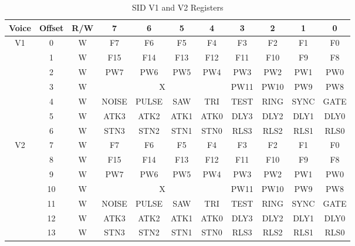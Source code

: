 \begin{table}[ht]
	\begin{center}
		\begin{tabular}{|c|c|c|c|c|c|c|c|c|c|c|} \hline
			Voice & Offset & R/W & 7 & 6 & 5 & 4 & 3 & 2 & 1 & 0 \\ \hline\hline
            \multirow{7}{*}{V1} & 0 & W & F7 & F6 & F5 & F4 & F3 & F2 & F1 & F0 \\ \cline{2-11}
            & 1 & W & F15 & F14 & F13 & F12 & F11 & F10 & F9 & F8 \\ \cline{2-11}
            & 2 & W & PW7 & PW6 & PW5 & PW4 & PW3 & PW2 & PW1 & PW0 \\ \cline{2-11}
            & 3 & W & \multicolumn{4}{|c|}{X} & PW11 & PW10 & PW9 & PW8 \\ \cline{2-11}
            & 4 & W & NOISE & PULSE & SAW & TRI & TEST & RING & SYNC & GATE \\ \cline{2-11}
            & 5 & W & ATK3 & ATK2 & ATK1 & ATK0 & DLY3 & DLY2 & DLY1 & DLY0 \\ \cline{2-11}
            & 6 & W & STN3 & STN2 & STN1 & STN0 & RLS3 & RLS2 & RLS1 & RLS0 \\ \hline\hline

            \multirow{7}{*}{V2} & 7 & W & F7 & F6 & F5 & F4 & F3 & F2 & F1 & F0\\ \cline{2-11}
            & 8 & W & F15 & F14 & F13 & F12 & F11 & F10 & F9 & F8 \\ \cline{2-11}
            & 9 & W & PW7 & PW6 & PW5 & PW4 & PW3 & PW2 & PW1 & PW0 \\ \cline{2-11}
            & 10 & W & \multicolumn{4}{|c|}{X} & PW11 & PW10 & PW9 & PW8 \\ \cline{2-11}
            & 11 & W & NOISE & PULSE & SAW & TRI & TEST & RING & SYNC & GATE \\ \cline{2-11}
            & 12 & W & ATK3 & ATK2 & ATK1 & ATK0 & DLY3 & DLY2 & DLY1 & DLY0 \\ \cline{2-11}
            & 13 & W & STN3 & STN2 & STN1 & STN0 & RLS3 & RLS2 & RLS1 & RLS0 \\ \hline\hline
		\end{tabular}
	\end{center}
	\caption{SID V1 and V2 Registers}
	\label{tab:sid_registers}
\end{table}

